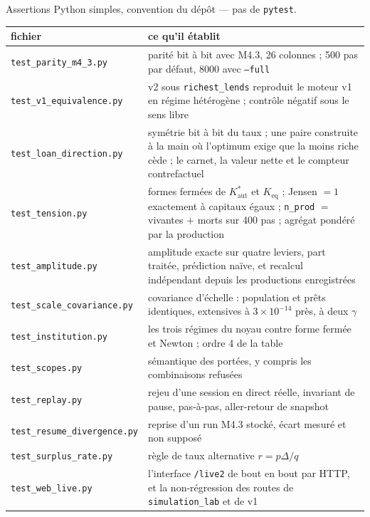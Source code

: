 \documentclass[11pt,a4paper]{article}
\newcommand{\code}[1]{\texttt{#1}}
\newcommand{\Kaut}{K^{*}_{\mathrm{aut}}}
\begin{document}
Assertions Python simples, convention du dépôt --- pas de \code{pytest}.

\begin{center}\footnotesize
\begin{tabular}{@{}lp{10.2cm}@{}}
\toprule
\textbf{fichier} & \textbf{ce qu'il établit} \\
\midrule
\code{test\_parity\_m4\_3.py} & parité bit à bit avec M4.3, 26 colonnes ;
500 pas par défaut, 8000 avec \code{--full} \\
\code{test\_v1\_equivalence.py} & v2 sous \code{richest\_lends} reproduit le
moteur v1 en régime hétérogène ; contrôle négatif sous le sens libre \\
\code{test\_loan\_direction.py} & symétrie bit à bit du taux ; une paire
construite à la main où l'optimum exige que la moins riche cède ; le carnet, la
valeur nette et le compteur contrefactuel \\
\code{test\_tension.py} & formes fermées de $\Kaut$ et $K_{\text{eq}}$ ;
Jensen $=1$ exactement à capitaux égaux ; \code{n\_prod} $=$ vivantes $+$ morts
sur 400 pas ; agrégat pondéré par la production \\
\code{test\_amplitude.py} & amplitude exacte sur quatre leviers, part traitée,
prédiction naïve, et recalcul indépendant depuis les productions enregistrées \\
\code{test\_scale\_covariance.py} & covariance d'échelle : population et prêts
identiques, extensives à $3\times10^{-14}$ près, à deux $\gamma$ \\
\code{test\_institution.py} & les trois régimes du noyau contre forme fermée et
Newton ; ordre 4 de la table \\
\code{test\_scopes.py} & sémantique des portées, y compris les combinaisons
refusées \\
\code{test\_replay.py} & rejeu d'une session en direct réelle, invariant de
pause, pas-à-pas, aller-retour de snapshot \\
\code{test\_resume\_divergence.py} & reprise d'un run M4.3 stocké, écart mesuré
et non supposé \\
\code{test\_surplus\_rate.py} & règle de taux alternative $r = p\Delta/q$ \\
\code{test\_web\_live.py} & l'interface \code{/live2} de bout en bout par HTTP,
et la non-régression des routes de \code{simulation\_lab} et de v1 \\
\bottomrule
\end{tabular}
\end{center}
\end{document}
